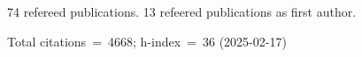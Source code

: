 74 refereed publications. 13 refeered publications as first author.

Total citations~=~4668; h-index~=~36 (2025-02-17)